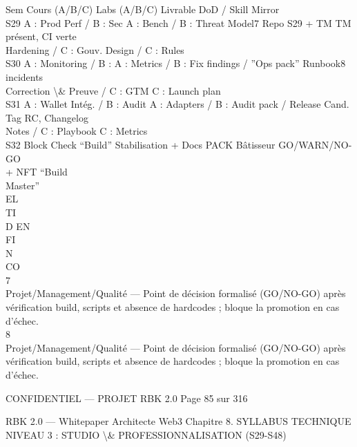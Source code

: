 \vspace{0.5em}
\vspace{0.5em}
Sem Cours (A/B/C)                 Labs (A/B/C)                     Livrable                        DoD / Skill Mirror\\
S29 A : Prod Perf / B : Sec       A : Bench / B : Threat Model7 Repo S29 + TM                      TM présent, CI verte\\
Hardening / C : Gouv. Design / C : Rules\\
S30 A : Monitoring / B :          A : Metrics / B : Fix findings / ”Ops pack”                      Runbook8 incidents\\
Correction \textbackslash{}& Preuve / C : GTM C : Launch plan\\
S31 A : Wallet Intég. / B : Audit A : Adapters / B : Audit pack / Release Cand.                    Tag RC, Changelog\\
Notes / C : Playbook          C : Metrics\\
S32 Block Check “Build”           Stabilisation + Docs             PACK Bâtisseur                 GO/WARN/NO-GO\\
+ NFT “Build\\
Master”\\
\vspace{0.5em}
\vspace{0.5em}
\vspace{0.5em}
\vspace{0.5em}
EL\\
TI\\
D     EN\\
FI\\
N\\
CO\\
\vspace{0.5em}
\vspace{0.5em}
\vspace{0.5em}
\vspace{0.5em}
7\\
Projet/Management/Qualité — Point de décision formalisé (GO/NO-GO) après vérification build, scripts et absence de hardcodes ; bloque la promotion en cas d’échec.\\
8\\
Projet/Management/Qualité — Point de décision formalisé (GO/NO-GO) après vérification build, scripts et absence de hardcodes ; bloque la promotion en cas d’échec.\\
\vspace{0.5em}
\vspace{0.5em}
\begin{confidential}CONFIDENTIEL — PROJET RBK 2.0                                            Page 85 sur 316\end{confidential}
RBK 2.0 — Whitepaper Architecte Web3                                                Chapitre 8. SYLLABUS TECHNIQUE\\
\vspace{0.5em}
\vspace{0.5em}
\vspace{0.5em}
NIVEAU 3 : STUDIO \textbackslash{}& PROFESSIONNALISATION (S29-S48)\\
\vspace{0.5em}
